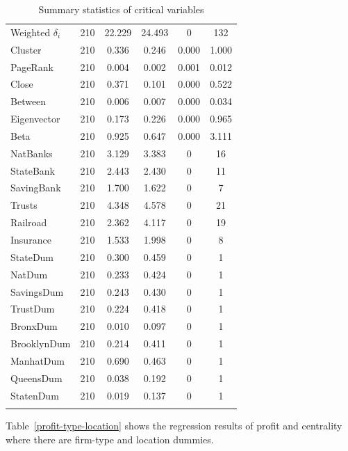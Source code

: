 \begin{subappendices}
\begin{table}[h!]
\begin{tabular}{lccccc}
Weighted $\delta_{i}$ & 210 & 22.229 & 24.493 & 0 & 132 \\
Cluster & 210 & 0.336 & 0.246 & 0.000 & 1.000 \\
PageRank & 210 & 0.004 & 0.002 & 0.001 & 0.012 \\
Close & 210 & 0.371 & 0.101 & 0.000 & 0.522 \\
Between & 210 & 0.006 & 0.007 & 0.000 & 0.034 \\
Eigenvector & 210 & 0.173 & 0.226 & 0.000 & 0.965 \\
Beta & 210 & 0.925 & 0.647 & 0.000 & 3.111 \\
NatBanks & 210 & 3.129 & 3.383 & 0 & 16 \\
StateBank & 210 & 2.443 & 2.430 & 0 & 11 \\
SavingBank & 210 & 1.700 & 1.622 & 0 & 7 \\
Trusts & 210 & 4.348 & 4.578 & 0 & 21 \\
Railroad & 210 & 2.362 & 4.117 & 0 & 19 \\
Insurance & 210 & 1.533 & 1.998 & 0 & 8 \\
StateDum & 210 & 0.300 & 0.459 & 0 & 1 \\
NatDum & 210 & 0.233 & 0.424 & 0 & 1 \\
SavingsDum & 210 & 0.243 & 0.430 & 0 & 1 \\
TrustDum & 210 & 0.224 & 0.418 & 0 & 1 \\
BronxDum & 210 & 0.010 & 0.097 & 0 & 1 \\
BrooklynDum & 210 & 0.214 & 0.411 & 0 & 1 \\
ManhatDum & 210 & 0.690 & 0.463 & 0 & 1 \\
QueensDum & 210 & 0.038 & 0.192 & 0 & 1 \\
StatenDum & 210 & 0.019 & 0.137 & 0 & 1 \\
\hline \\[-1.8ex]
\end{tabular}
\label{fin-ss}
\caption{Summary statistics of critical variables}
\end{table}

Table~\ref{profit-type-location} shows the regression results of profit and centrality where there are firm-type and location dummies.


\end{subappendices}
